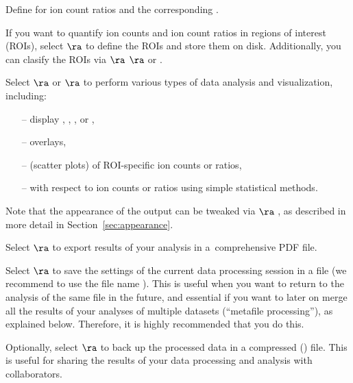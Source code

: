 \s Define  for ion count ratios and the corresponding . 

\s If you want to quantify ion counts and ion count ratios in regions of interest (ROIs), select  $\ra$  to define the ROIs and store them on disk. Additionally, you can clasify the ROIs via  $\ra$  $\ra$  or .

\s Select  $\ra$  or  $\ra$  to perform various types of data analysis and visualization, including:

\begin{itemize}
\item[--] display , , , or ,
\item[--]  overlays,
\item[--]  (scatter plots) of ROI-specific ion counts or ratios,  
\item[--]  with respect to ion counts or ratios using simple statistical methods.
\end{itemize}
%

\bul Note that the appearance of the output can be tweaked via  $\ra$ , as described in more detail in Section~\ref{sec:appearance}.

\s Select  $\ra$  to export results of your analysis in a~comprehensive PDF file. 

\s Select  $\ra$  to save the settings of the current data processing session in a file (we recommend to use the file name ). This is useful when you want to return to the analysis of the same file in the future, and essential if you want to later on merge all the results of your analyses of multiple datasets (``metafile processing''), as explained below. Therefore, it is highly recommended that you do this.

\s Optionally, select  $\ra$  to back up the processed data in a compressed () file. This is useful for sharing the results of your data processing and analysis with collaborators.



